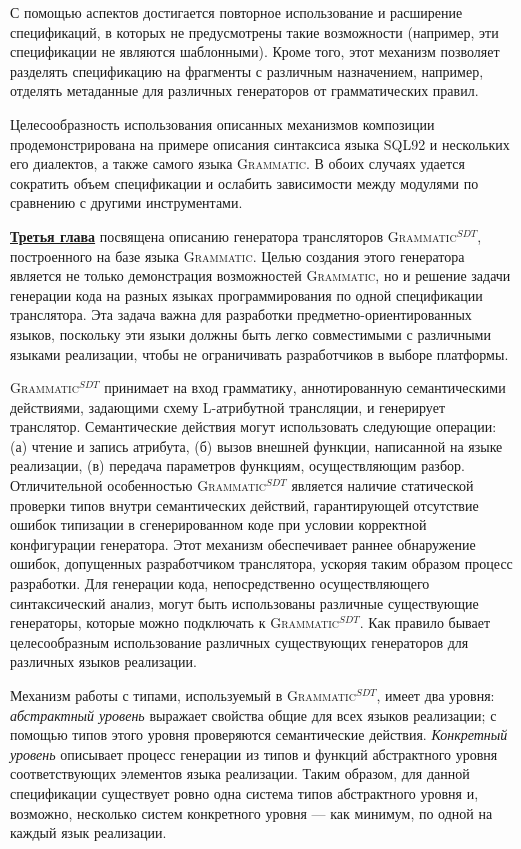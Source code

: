 \documentclass[12pt,a4paper]{article}
\newcommand{\term}[1]{\emph{#1}}
\newcommand{\tool}[1]{\textsc{#1}}
\theoremstyle{definition}
\theoremstyle{plain}
\newcommand{\GRM}{\tool{Grammatic}}
\newcommand{\ATF}{\tool{Grammatic$^{SDT}$}}
\newcommand{\afsubsection}[1]{\par \underline{\textbf{#1}}}
\begin{document}
С помощью аспектов достигается повторное использование  и расширение спецификаций, в которых не предусмотрены такие возможности (например, эти спецификации не являются шаблонными). Кроме того, этот механизм позволяет разделять спецификацию на фрагменты с различным назначением, например, отделять метаданные для различных генераторов от грамматических правил.

Целесообразность использования описанных механизмов композиции продемонстрирована на примере описания синтаксиса языка SQL92 и нескольких его диалектов, а также самого языка \GRM{}. В обоих случаях удается сократить объем спецификации и ослабить зависимости между модулями по сравнению с другими инструментами.
\afsubsection{Третья глава} посвящена описанию генератора трансляторов \ATF{}, построенного на базе языка \GRM{}. Целью создания этого генератора является не только демонстрация возможностей \GRM{}, но и решение задачи генерации кода на разных языках программирования по одной спецификации транслятора. Эта задача важна для разработки предметно-ориентированных языков, поскольку эти языки должны быть легко совместимыми с различными языками реализации, чтобы не ограничивать разработчиков в выборе платформы.

\ATF{} принимает на вход грамматику, аннотированную семантическими действиями, задающими схему L-атрибутной трансляции, и генерирует транслятор. Семантические действия могут использовать следующие операции: (а) чтение и запись атрибута, (б) вызов внешней функции, написанной на языке реализации, (в) передача параметров функциям, осуществляющим разбор. 
Отличительной особенностью \ATF{} является наличие статической проверки типов внутри семантических действий, гарантирующей отсутствие ошибок типизации в сгенерированном коде при условии корректной конфигурации генератора. Этот механизм обеспечивает раннее обнаружение ошибок, допущенных разработчиком транслятора, ускоряя таким образом процесс разработки.
Для генерации кода, непосредственно осуществляющего синтаксический анализ, могут быть использованы различные существующие генераторы, которые можно подключать к \ATF{}. Как правило бывает целесообразным использование различных существующих генераторов для различных языков реализации.

Механизм работы с типами, используемый в \ATF{}, имеет два уровня: \term{абстрактный уровень} выражает свойства общие для всех языков реализации; с помощью типов этого уровня проверяются семантические действия. \term{Конкретный уровень} описывает процесс генерации из типов и функций абстрактного уровня соответствующих элементов языка реализации. Таким образом, для данной спецификации существует ровно одна система типов абстрактного уровня и, возможно, несколько систем конкретного уровня --- как минимум, по одной на каждый язык реализации.
\end{document}
